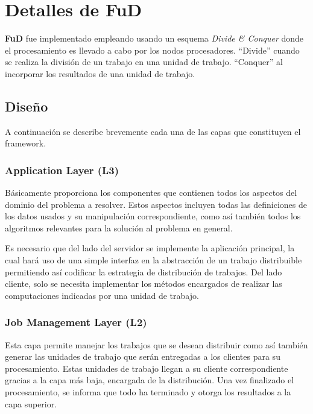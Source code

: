 \chapter{Detalles de FuD}
\label{detFud}

\par \textbf{FuD} fue implementado empleando usando un esquema \emph{Divide \& Conquer} donde el procesamiento es llevado a cabo por los nodos procesadores. ``Divide'' cuando se realiza la división de un trabajo en una unidad de trabajo. ``Conquer'' al incorporar los resultados de una unidad de trabajo.

\section{Diseño}
A continuación se describe brevemente cada una de las capas que constituyen el framework.

\subsection{Application Layer (L3)} 
\par Básicamente proporciona los componentes que contienen todos los aspectos del dominio del problema a resolver. Estos aspectos incluyen todas las definiciones de los datos usados y su manipulación correspondiente, como así también todos los algoritmos relevantes para la solución al problema en general. 

\par Es necesario que del lado del servidor se implemente la aplicación principal, la cual hará uso de una simple interfaz en la abstracción de un trabajo distribuible permitiendo así codificar la estrategia de distribución de trabajos. Del lado cliente, solo se necesita implementar los métodos encargados de realizar las computaciones indicadas por una unidad de trabajo.

\subsection{Job Management Layer (L2)} %
\par Esta capa permite manejar los trabajos que se desean distribuir como así también generar las unidades de trabajo que serán entregadas a los clientes para su procesamiento. Estas unidades de trabajo llegan a su cliente correspondiente gracias a la capa más baja, encargada de la distribución. Una vez finalizado el procesamiento, se informa que todo ha terminado y otorga los resultados a la capa superior.

